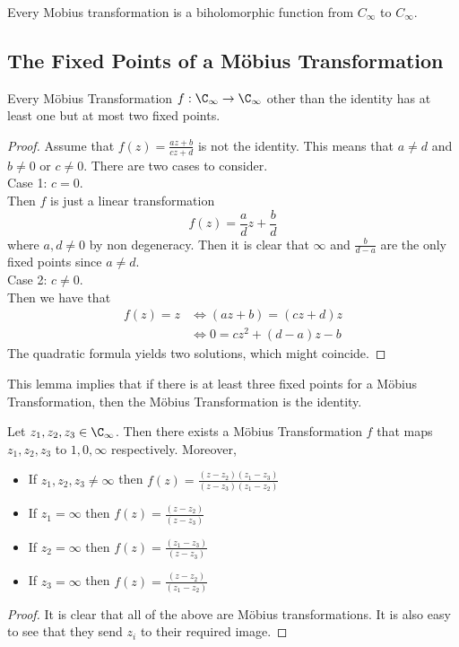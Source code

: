 \documentclass[a4paper]{article}
\begin{document}
\begin{lmm}{}{} Every Mobius transformation is a biholomorphic function from $C_\infty$ to $C_\infty$. 
\end{lmm}

\subsection{The Fixed Points of a Möbius Transformation}
\begin{lmm}{}{} Every Möbius Transformation $f:\C_\infty\to\C_\infty$ other than the identity has at least one but at most two fixed points. 
\begin{proof}
Assume that $f(z)=\frac{az+b}{cz+d}$ is not the identity. This means that $a\neq d$ and $b\neq 0$ or $c\neq 0$. There are two cases to consider. \\

Case 1: $c=0$. \\
Then $f$ is just a linear transformation $$f(z)=\frac{a}{d}z+\frac{b}{d}$$ where $a,d\neq 0$ by non degeneracy. Then it is clear that $\infty$ and $\frac{b}{d-a}$ are the only fixed points since $a\neq d$. \\

Case 2: $c\neq 0$. \\
Then we have that 
\begin{align*}
f(z)=z&\iff (az+b)=(cz+d)z\\
&\iff 0=cz^2+(d-a)z-b
\end{align*}
The quadratic formula yields two solutions, which might coincide. 
\end{proof}
\end{lmm}

This lemma implies that if there is at least three fixed points for a Möbius Transformation, then the Möbius Transformation is the identity. 

\begin{prp}{}{} Let $z_1,z_2,z_3\in\C_\infty$. Then there exists a Möbius Transformation $f$ that maps $z_1,z_2,z_3$ to $1,0,\infty$ respectively. Moreover, 
\begin{itemize}
\item If $z_1,z_2,z_3\neq\infty$ then $f(z)=\frac{(z-z_2)(z_1-z_3)}{(z-z_3)(z_1-z_2)}$
\item If $z_1=\infty$ then $f(z)=\frac{(z-z_2)}{(z-z_3)}$
\item If $z_2=\infty$ then $f(z)=\frac{(z_1-z_3)}{(z-z_3)}$
\item If $z_3=\infty$ then $f(z)=\frac{(z-z_2)}{(z_1-z_2)}$
\end{itemize} 
\begin{proof}
It is clear that all of the above are Möbius transformations. It is also easy to see that they  send $z_i$ to their required image. 
\end{proof}
\end{prp}
\end{document}

